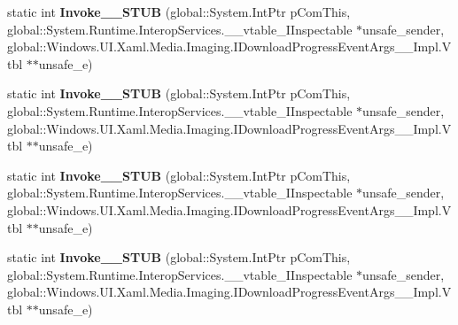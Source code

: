 \begin{DoxyCompactItemize}
\item 
\mbox{\label{struct_windows_1_1_u_i_1_1_xaml_1_1_media_1_1_imaging_1_1_download_progress_event_handler_____impl_1_1_vtbl_a7f25f3b94723e44f95176df16fa94d75}} 
static int {\bfseries Invoke\+\_\+\+\_\+\+S\+T\+UB} (global\+::\+System.\+Int\+Ptr p\+Com\+This, global\+::\+System.\+Runtime.\+Interop\+Services.\+\_\+\+\_\+vtable\+\_\+\+I\+Inspectable $\ast$unsafe\+\_\+sender, global\+::\+Windows.\+U\+I.\+Xaml.\+Media.\+Imaging.\+I\+Download\+Progress\+Event\+Args\+\_\+\+\_\+\+Impl.\+Vtbl $\ast$$\ast$unsafe\+\_\+e)
\item 
\mbox{\label{struct_windows_1_1_u_i_1_1_xaml_1_1_media_1_1_imaging_1_1_download_progress_event_handler_____impl_1_1_vtbl_a7f25f3b94723e44f95176df16fa94d75}} 
static int {\bfseries Invoke\+\_\+\+\_\+\+S\+T\+UB} (global\+::\+System.\+Int\+Ptr p\+Com\+This, global\+::\+System.\+Runtime.\+Interop\+Services.\+\_\+\+\_\+vtable\+\_\+\+I\+Inspectable $\ast$unsafe\+\_\+sender, global\+::\+Windows.\+U\+I.\+Xaml.\+Media.\+Imaging.\+I\+Download\+Progress\+Event\+Args\+\_\+\+\_\+\+Impl.\+Vtbl $\ast$$\ast$unsafe\+\_\+e)
\item 
\mbox{\label{struct_windows_1_1_u_i_1_1_xaml_1_1_media_1_1_imaging_1_1_download_progress_event_handler_____impl_1_1_vtbl_a7f25f3b94723e44f95176df16fa94d75}} 
static int {\bfseries Invoke\+\_\+\+\_\+\+S\+T\+UB} (global\+::\+System.\+Int\+Ptr p\+Com\+This, global\+::\+System.\+Runtime.\+Interop\+Services.\+\_\+\+\_\+vtable\+\_\+\+I\+Inspectable $\ast$unsafe\+\_\+sender, global\+::\+Windows.\+U\+I.\+Xaml.\+Media.\+Imaging.\+I\+Download\+Progress\+Event\+Args\+\_\+\+\_\+\+Impl.\+Vtbl $\ast$$\ast$unsafe\+\_\+e)
\item 
\mbox{\label{struct_windows_1_1_u_i_1_1_xaml_1_1_media_1_1_imaging_1_1_download_progress_event_handler_____impl_1_1_vtbl_a7f25f3b94723e44f95176df16fa94d75}} 
static int {\bfseries Invoke\+\_\+\+\_\+\+S\+T\+UB} (global\+::\+System.\+Int\+Ptr p\+Com\+This, global\+::\+System.\+Runtime.\+Interop\+Services.\+\_\+\+\_\+vtable\+\_\+\+I\+Inspectable $\ast$unsafe\+\_\+sender, global\+::\+Windows.\+U\+I.\+Xaml.\+Media.\+Imaging.\+I\+Download\+Progress\+Event\+Args\+\_\+\+\_\+\+Impl.\+Vtbl $\ast$$\ast$unsafe\+\_\+e)

\end{DoxyCompactItemize}
